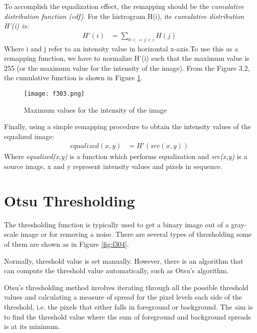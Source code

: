 To accomplish the equalization effect, the remapping should be the \textit{cumulative distribution function (cdf)}. For the histrogram H(i), its \textit{cumulative distribution H'(i) is:}
\begin{align}
	H'(i) &= \sum_{0<=j<i}H(j)
\end{align}
Where i and j refer to an intensity value in horizontal x-axis.To use this as a remapping function, we have to normalize H'(i) such that the maximum value is 255 (or the maximum value for the intensity of the image). From the Figure 3.2, the cumulative function is shown in Figure \ref{fig:f303}.
\begin{figure}[t]
	\centering
	\texttt{[image: f303.png]}
	\caption{Maximum values for the intensity of the image}
	\label{fig:f303}
\end{figure}
Finally, using a simple remapping procedure to obtain the intensity values of the equalized image:
\begin{align}
	equalized(x,y) &= H'(src(x,y)) 
\end{align}
Where \textit{equalized(x,y)} is a function which performs equalization and \textit{src(x,y)} is a source image, x and y represent intensity values and pixels in sequence. 


\section{Otsu Thresholding}\label{sec:3.2}
The thresholding function is typically used to get a binary image out of a gray-scale image or for removing a noise. There are several types of thresholding some of them are shown as in Figure \ref{fig:f304}.

Normally, threshold value is set manually. However, there is an algorithm that can compute the threshold value automatically, such as Otsu's algorithm.

Otsu's thresholding method involves iterating through all the possible threshold values and calculating a measure of spread for the pixel levels each side of the threshold, i.e. the pixels that either falls in foreground or background. The aim is to find the threshold value where the sum of foreground and background spreads is at its minimum.


